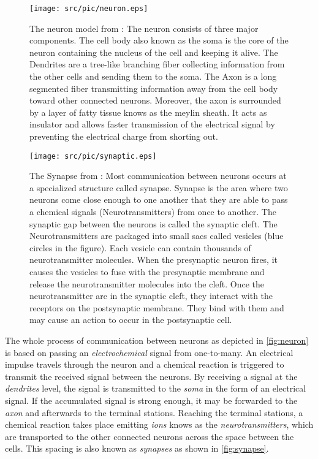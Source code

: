 \begin{figure}[ht!]
  \centering
  \texttt{[image: src/pic/neuron.eps]}
  \caption{The neuron model from \citep{introductiontopsychology}: The neuron consists of three major components. The cell body also
  known as the soma is the core of the neuron containing the nucleus of the cell and keeping
  it alive. The Dendrites are a tree-like branching fiber collecting information from the other
  cells and sending them to the soma. The Axon is a long segmented fiber transmitting
  information away from the cell body toward other connected neurons. Moreover, the axon
  is surrounded by a layer of fatty tissue knows as the meylin sheath. It acts as insulator and
  allows faster transmission of the electrical signal by preventing the electrical charge from
  shorting out.}
  \label{fig:neuron}
\end{figure}


\begin{figure}[ht!]
  \centering
  \texttt{[image: src/pic/synaptic.eps]}
  \caption{The Synapse from \citep{Neurotransmitters}: Most communication between neurons occurs at a specialized structure called synapse. Synapse is the area where two neurons come close enough to one another that they are able to pass a chemical signals (Neurotransmitters) from once to another. The synaptic gap between the neurons is called the synaptic cleft. The Neurotransmitters are packaged into small sacs called vesicles (blue circles in the figure). Each vesicle can contain thousands of neurotransmitter molecules. When the presynaptic neuron fires, it causes the vesicles to fuse with the presynaptic membrane and release the neurotransmitter molecules into the cleft. Once the neurotransmitter are in the synaptic cleft, they interact with the receptors on the postsynaptic membrane. They bind with them and may cause an action to occur in the postsynaptic cell.}
  \label{fig:synapse}
\end{figure}


The whole process of communication between neurons as depicted in \autoref{fig:neuron} is based on passing an \emph{electrochemical} signal from one-to-many. An electrical impulse travels through the neuron and a chemical reaction is triggered to transmit the received signal between the neurons. By receiving a signal at the \emph{dendrites} level, the signal is transmitted to the \emph{soma} in the form of an electrical signal. If the accumulated signal is strong enough, it may be forwarded to the \emph{axon} and afterwards to the terminal stations. Reaching the terminal stations, a chemical reaction takes place emitting \emph{ions} knows as the \emph{neurotransmitters}, which are transported to the other connected neurons across the space between the cells. This spacing is also known as \emph{synapses} as shown in \autoref{fig:synapse}. 

